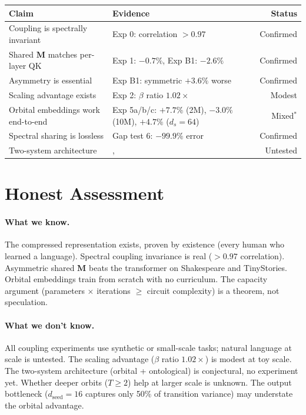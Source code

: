 \documentclass[11pt, a4paper]{article}
\newcommand{\M}{\mathbf{M}}
\theoremstyle{remark}
\begin{document}
\begin{center}\small
\renewcommand{\arraystretch}{1.1}
\begin{tabular}{@{}llr@{}}
\toprule
\textbf{Claim} & \textbf{Evidence} & \textbf{Status} \\
\midrule
Coupling is spectrally invariant & Exp 0: correlation $>0.97$ & Confirmed \\
Shared $\M$ matches per-layer QK & Exp 1: $-0.7\%$, Exp B1: $-2.6\%$ & Confirmed \\
Asymmetry is essential & Exp B1: symmetric $+3.6\%$ worse & Confirmed \\
Scaling advantage exists & Exp 2: $\beta$ ratio $1.02\times$ & Modest \\
Orbital embeddings work end-to-end & Exp 5a/b/c: $+7.7\%$ (2M), $-3.0\%$ (10M), $+4.7\%$ ($d_s{=}64$) & Mixed$^*$ \\
Spectral sharing is lossless & Gap test 6: $-99.9\%$ error & Confirmed \\
Two-system architecture & ,  & Untested \\
\bottomrule
\end{tabular}
\end{center}


\section{Honest Assessment}
\label{sec:risks}

\paragraph{What we know.}
The compressed representation exists, proven by existence (every human who learned a language).
Spectral coupling invariance is real ($>0.97$ correlation).
Asymmetric shared $\M$ beats the transformer on Shakespeare and TinyStories.
Orbital embeddings train from scratch with no curriculum.
The capacity argument (parameters $\times$ iterations $\geq$ circuit complexity) is a theorem, not speculation.

\paragraph{What we don't know.}
All coupling experiments use synthetic or small-scale tasks; natural language at scale is untested.
The scaling advantage ($\beta$ ratio $1.02\times$) is modest at toy scale.
The two-system architecture (orbital + ontological) is conjectural, no experiment yet.
Whether deeper orbits ($T \geq 2$) help at larger scale is unknown.
The output bottleneck ($d_{\text{seed}} = 16$ captures only 50\% of transition variance) may understate the orbital advantage.
\end{document}
